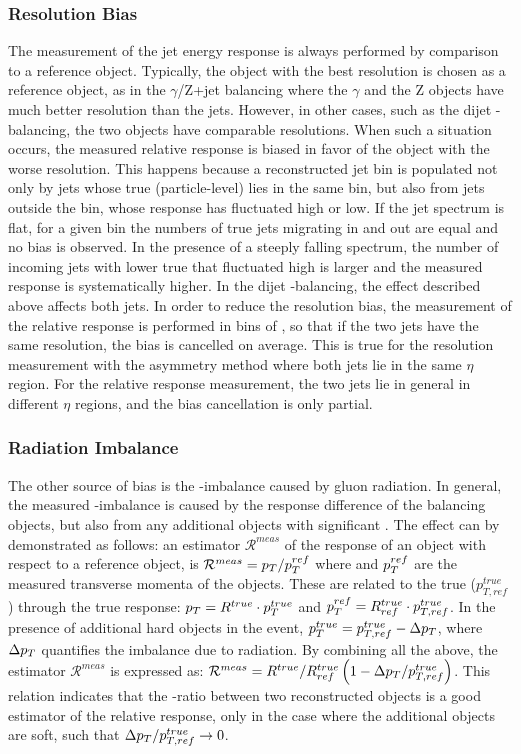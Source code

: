 \subsubsection{Resolution Bias}\label{sec:resbias}

The measurement of the jet energy response is always performed by comparison to a reference object. Typically, the object with the best resolution is chosen as a reference object, as in the $\gamma$/Z+jet balancing where the $\gamma$ and the Z objects have much better \pt resolution than the jets. However, in other cases, such as the dijet \pt-balancing, the two objects have comparable resolutions. When such a situation occurs, the measured relative response is biased in favor of the object with the worse resolution. This happens because a reconstructed jet \pt bin is populated not only by jets whose true (particle-level) \pt lies in the same bin, but also from jets outside the bin, whose response has fluctuated high or low. If the jet spectrum is flat, for a given bin the numbers of true jets migrating in and out are equal and no bias is observed. In the presence of a steeply falling spectrum, the number of incoming jets with lower true \pt that fluctuated high is larger and the measured response is systematically higher. In the dijet \pt-balancing, the effect described above affects both jets. In order to reduce the resolution bias, the measurement of the relative response is performed in bins of \ptave, so that if the two jets have the same resolution, the bias is cancelled on average. This is true for the resolution measurement with the asymmetry method where both jets lie in the same $\eta$ region. For the relative response measurement, the two jets lie in general in different $\eta$ regions, and the bias cancellation is only partial.

\subsubsection{Radiation Imbalance}\label{sec:radbias}

The other source of bias is the \pt-imbalance caused by gluon radiation. In general, the measured \pt-imbalance is caused by the response difference of the balancing objects, but also from any additional objects with significant \pt. The effect can by demonstrated as follows: an estimator $\mathcal{R}^{meas}$ of the response of an object with respect to a reference object, is $\mathcal{R}^{meas}=p_{{T}}/p_{{T}}^{ref}$ where \pt and $p_{{T}}^{ref}$ are the measured transverse momenta of the objects. These are related to the true \pt ($p^{true}_{T,ref}$) through the true response: $p_{{T}}=R^{true}\cdot p_{{T}}^{true}$ and $p_{{T}}^{ref}=R^{true}_{ref}\cdot p^{true}_{T,ref}$. In the presence of additional hard objects in the event, $p_{{T}}^{true}=p^{true}_{T,ref}-\Delta p_{{T}}$, where $\Delta p_{{T}}$ quantifies the imbalance due to radiation.  By combining all the above, the estimator $\mathcal{R}^{meas}$ is expressed as: $\mathcal{R}^{meas}=R^{true}/R^{true}_{ref}\left(1-\Delta p_{{T}}/p^{true}_{T,ref}\right)$. This relation indicates that the \pt-ratio between two reconstructed objects is a good estimator of the relative response, only in the case where the additional objects are soft, such that $\Delta p_{{T}}/p_{T,ref}^{true}\rightarrow 0$. 

